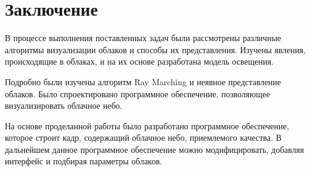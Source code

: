 \chapter{Заключение}

В процессе выполнения поставленных задач были рассмотрены различные алгоритмы визуализации облаков и способы их представления. Изучены явления, происходящие в облаках, и на их основе разработана модель освещения. 

Подробно были изучены алгоритм Ray Marching и неявное представление облаков. Было спроектировано программное обеспечение, позволяющее визуализировать облачное небо.

На основе проделанной работы было разработано программное обеспечение, которое строит кадр, содержащий облачное небо, приемлемого качества. В дальнейшем данное программное обеспечение можно модифицировать, добавляя интерфейс и подбирая параметры облаков.